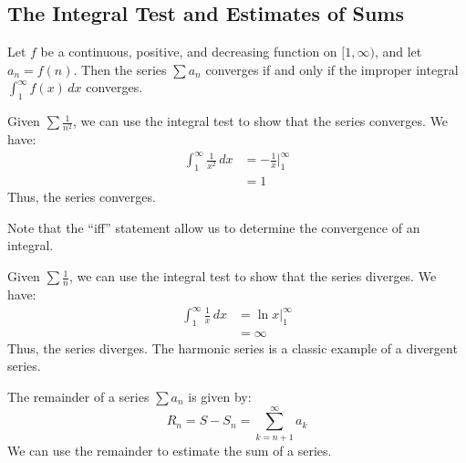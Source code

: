 \documentclass[11pt]{article}
\begin{document}
\subsection{The Integral Test and Estimates of Sums}
\begin{theorem}
    Let $f$ be a continuous, positive, and decreasing function on $[1, \infty)$, and let $a_n = f(n)$. Then the series $\sum a_n$ converges if and only if the improper integral $\int_1^{\infty} f(x) \, dx$ converges.
\end{theorem}
\begin{example}[$p$=2-series]
    Given $\sum \frac{1}{n^2}$, we can use the integral test to show that the series converges. We have:
    \begin{align*}
        \int_1^{\infty} \frac{1}{x^2} \, dx &= -\frac{1}{x} \Big|_1^{\infty} \\
        &= 1
    \end{align*}
    Thus, the series converges.
\end{example}
Note that the ``iff'' statement allow us to determine the convergence of an integral.
\begin{example}
    Given $\sum \frac{1}{n}$, we can use the integral test to show that the series diverges. We have:
    \begin{align*}
        \int_1^{\infty} \frac{1}{x} \, dx &= \ln x \Big|_1^{\infty} \\
        &= \infty
    \end{align*}
    Thus, the series diverges. The harmonic series is a classic example of a divergent series.
\end{example}
\begin{definition}[Remainder]
    The remainder of a series $\sum a_n$ is given by:
    \begin{equation}
        R_n = S - S_n = \sum_{k=n+1}^{\infty} a_k
    \end{equation}
    We can use the remainder to estimate the sum of a series.
\end{definition}
\end{document}
